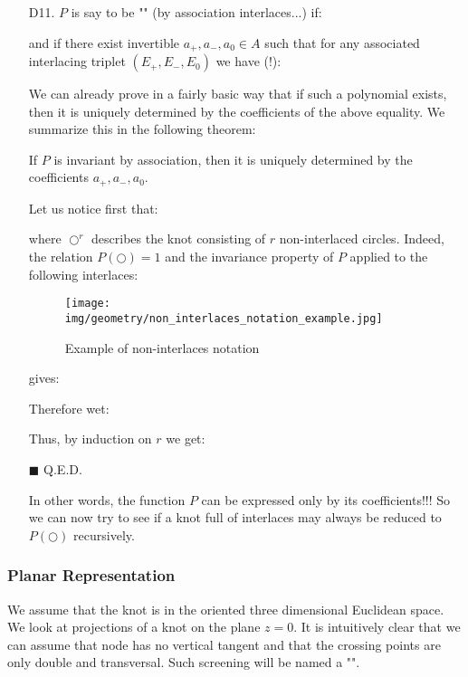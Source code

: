 {\begin{enumerate}
		\item[D11.] $P$ is say to be "" (by association interlaces...) if:
		
		and if there exist invertible $a_+,a_{-},a_0 \in A$ such that for any associated interlacing triplet $(E_+,E_{-},E_0)$ we have (!):
		
		We can already prove in a fairly basic way that if such a polynomial exists, then it is uniquely determined by the coefficients of the above equality. We summarize this in the following theorem:
		
		\begin{theorem}
			If $P$ is invariant by association, then it is uniquely determined by the coefficients  $a_+,a_{-},a_0$.
		\end{theorem}
		\begin{dem}
		Let us notice first that:
		
		where $\bigcirc^r$ describes the knot consisting of $r$ non-interlaced circles. Indeed, the relation $P(\bigcirc)=1$ and the invariance property of $P$ applied to the following interlaces:
		\begin{figure}[H]
			\centering
			\texttt{[image: img/geometry/non\_interlaces\_notation\_example.jpg]}
			\caption{Example of non-interlaces notation}
		\end{figure}
		gives:
		
		Therefore wet:
		
		Thus, by induction on $r$ we get:
		
		\begin{flushright}
			$\blacksquare$  Q.E.D.
		\end{flushright}
		\end{dem}
		In other words, the function $P$ can be expressed only by its coefficients!!! So we can now try to see if a knot full of interlaces may always be reduced to $P(\bigcirc)$ recursively.
	\end{enumerate}
	
	\subsubsection{Planar Representation}
	We assume that the knot is in the oriented three dimensional Euclidean space. We look at projections of a knot on the plane $z=0$. It is intuitively clear that we can assume that node has no vertical tangent and that the crossing points are only double and transversal. Such screening will be named a "".
	
}

